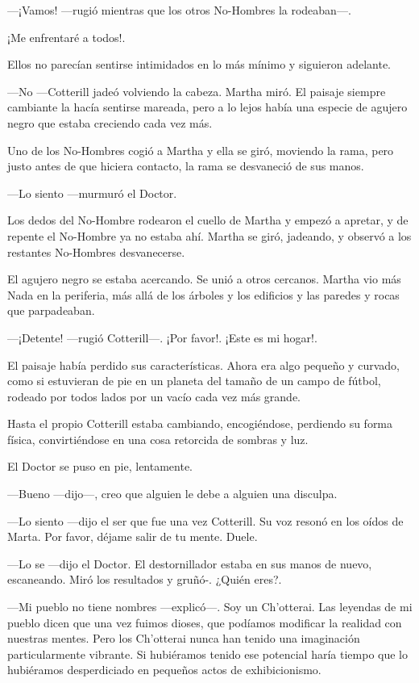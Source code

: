 ---¡Vamos! ---rugió mientras que los otros No-Hombres la rodeaban---.

¡Me enfrentaré a todos!.

Ellos no parecían sentirse intimidados en lo más mínimo y siguieron adelante.

---No ---Cotterill jadeó volviendo la cabeza. Martha miró. El paisaje siempre cambiante la hacía sentirse mareada, pero a lo lejos había una especie de agujero negro que estaba creciendo cada vez más.

Uno de los No-Hombres cogió a Martha y ella se giró, moviendo la rama, pero justo antes de que hiciera contacto, la rama se desvaneció de sus manos.

---Lo siento ---murmuró el Doctor.

Los dedos del No-Hombre rodearon el cuello de Martha y empezó a apretar, y de repente el No-Hombre ya no estaba ahí. Martha se giró, jadeando, y observó a los restantes No-Hombres desvanecerse.

El agujero negro se estaba acercando. Se unió a otros cercanos. Martha vio más Nada en la periferia, más allá de los árboles y los edificios y las paredes y rocas que parpadeaban.

---¡Detente! ---rugió Cotterill---. ¡Por favor!. ¡Este es mi hogar!.

El paisaje había perdido sus características. Ahora era algo pequeño y curvado, como si estuvieran de pie en un planeta del tamaño de un campo de fútbol, rodeado por todos lados por un vacío cada vez más grande.

Hasta el propio Cotterill estaba cambiando, encogiéndose, perdiendo su forma física, convirtiéndose en una cosa retorcida de sombras y luz.

El Doctor se puso en pie, lentamente.

---Bueno ---dijo---, creo que alguien le debe a alguien una disculpa.

---Lo siento ---dijo el ser que fue una vez Cotterill. Su voz resonó en los oídos de Marta. Por favor, déjame salir de tu mente. Duele.

---Lo se ---dijo el Doctor. El destornillador estaba en sus manos de nuevo, escaneando. Miró los resultados y gruñó-. ¿Quién eres?.

---Mi pueblo no tiene nombres ---explicó---. Soy un Ch'otterai. Las leyendas de mi pueblo dicen que una vez fuimos dioses, que podíamos modificar la realidad con nuestras mentes. Pero los Ch'otterai nunca han tenido una imaginación particularmente vibrante. Si hubiéramos tenido ese potencial haría tiempo que lo hubiéramos desperdiciado en pequeños actos de exhibicionismo.


